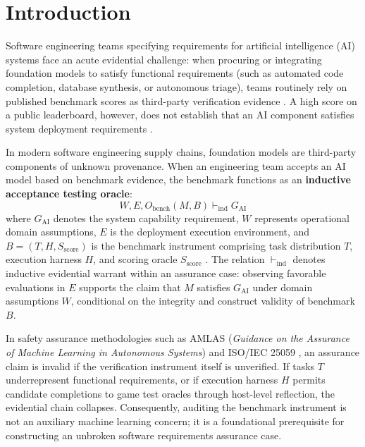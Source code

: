 \documentclass[runningheads]{llncs}
\begin{document}
\section{Introduction}
\label{sec:introduction}

Software engineering teams specifying requirements for artificial intelligence (AI) systems face an acute evidential challenge: when procuring or integrating foundation models to satisfy functional requirements (such as automated code completion, database synthesis, or autonomous triage), teams routinely rely on published benchmark scores as third-party verification evidence \cite{habiba_re4ai_maturity_2024}. A high score on a public leaderboard, however, does not establish that an AI component satisfies system deployment requirements \cite{singh_leaderboard_illusion,alonso_church_sigir}. 

In modern software engineering supply chains, foundation models are third-party components of unknown provenance. When an engineering team accepts an AI model based on benchmark evidence, the benchmark functions as an \textbf{inductive acceptance testing oracle}:
\begin{equation}
\label{eq:inductive_oracle}
W, E, O_{\text{bench}}(M, B) \vdash_{\text{ind}} G_{\text{AI}}
\end{equation}
where $G_{\text{AI}}$ denotes the system capability requirement, $W$ represents operational domain assumptions, $E$ is the deployment execution environment, and $B = (T, H, S_{\text{score}})$ is the benchmark instrument comprising task distribution $T$, execution harness $H$, and scoring oracle $S_{\text{score}}$ \cite{bean_measuring_what_matters}. The relation $\vdash_{\text{ind}}$ denotes inductive evidential warrant within an assurance case: observing favorable evaluations in $E$ supports the claim that $M$ satisfies $G_{\text{AI}}$ under domain assumptions $W$, conditional on the integrity and construct validity of benchmark $B$.

In safety assurance methodologies such as AMLAS (\emph{Guidance on the Assurance of Machine Learning in Autonomous Systems}) \cite{hawkins_amlas_2021} and ISO/IEC 25059 \cite{iso_iec_25059_2023}, an assurance claim is invalid if the verification instrument itself is unverified. If tasks $T$ underrepresent functional requirements, or if execution harness $H$ permits candidate completions to game test oracles through host-level reflection, the evidential chain collapses. Consequently, auditing the benchmark instrument is not an auxiliary machine learning concern; it is a foundational prerequisite for constructing an unbroken software requirements assurance case.
\end{document}
